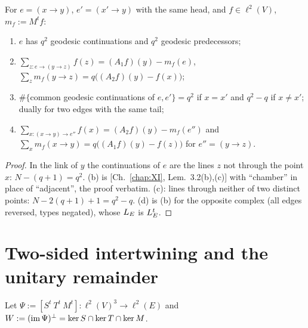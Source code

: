 \begin{lemma}\label{XV:lem:local}
For $e=(x\to y)$, $e'=(x'\to y)$ with the same head, and $f\in\ell^{2}(V)$, $m_f:=M^{t}f$:
\begin{enumerate}
\item[(a)] $e$ has $q^{2}$ geodesic continuations and $q^{2}$ geodesic predecessors;
\item[(b)] $\sum_{z\colon e\to(y\to z)}f(z)=(A_1f)(y)-m_f(e)$,\quad
$\sum_{z}m_f(y\to z)=q\bigl((A_2f)(y)-f(x)\bigr)$;
\item[(c)] $\#\{$common geodesic continuations of $e,e'\}=q^{2}$ if $x=x'$ and $q^{2}-q$ if
$x\ne x'$; dually for two edges with the same tail;
\item[(d)] $\sum_{x\colon(x\to y)\to e''}f(x)=(A_2f)(y)-m_f(e'')$ and
$\sum_{x}m_f(x\to y)=q\bigl((A_1f)(y)-f(z)\bigr)$ for $e''=(y\to z)$.
\end{enumerate}
\end{lemma}

\begin{proof}
In the link of $y$ the continuations of $e$ are the lines $z$ not through the point $x$:
$N-(q{+}1)=q^{2}$. (b) is [Ch.~\ref{chap:XI}, Lem.~3.2(b),(c)] with ``chamber'' in place of ``adjacent'', the
proof verbatim. (c): lines through neither of two distinct points: $N-2(q{+}1)+1=q^{2}-q$.
(d) is (b) for the opposite complex (all edges reversed, types negated), whose $L_E$ is
$L_E^{t}$.
\end{proof}

\section{Two-sided intertwining and the unitary remainder}\label{XV:sec:intertwine}

Let $\Psi:=[S^{t}\ T^{t}\ M^{t}]\colon\ell^{2}(V)^{3}\to\ell^{2}(E)$ and
$W:=(\operatorname{im}\Psi)^{\perp}=\ker S\cap\ker T\cap\ker M$.

